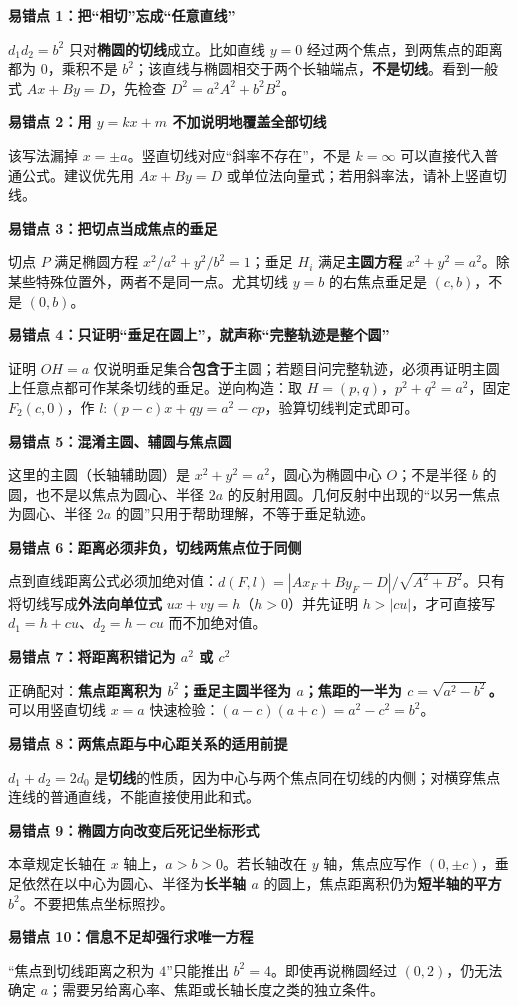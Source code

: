 \begin{trapbox}
\textbf{易错点 1：把“相切”忘成“任意直线”}\par
$d_1d_2=b^2$ 只对\textbf{椭圆的切线}成立。比如直线 $y=0$ 经过两个焦点，到两焦点的距离都为 $0$，乘积不是 $b^2$；该直线与椭圆相交于两个长轴端点，\textbf{不是切线}。看到一般式 $Ax+By=D$，先检查 $D^2=a^2A^2+b^2B^2$。

\medskip
\textbf{易错点 2：用 $y=kx+m$ 不加说明地覆盖全部切线}\par
该写法漏掉 $x=\pm a$。竖直切线对应“斜率不存在”，不是 $k=\infty$ 可以直接代入普通公式。建议优先用 $Ax+By=D$ 或单位法向量式；若用斜率法，请补上竖直切线。

\medskip
\textbf{易错点 3：把切点当成焦点的垂足}\par
切点 $P$ 满足椭圆方程 $x^2/a^2+y^2/b^2=1$；垂足 $H_i$ 满足\textbf{主圆方程} $x^2+y^2=a^2$。除某些特殊位置外，两者不是同一点。尤其切线 $y=b$ 的右焦点垂足是 $(c,b)$，不是 $(0,b)$。

\medskip
\textbf{易错点 4：只证明“垂足在圆上”，就声称“完整轨迹是整个圆”}\par
证明 $OH=a$ 仅说明垂足集合\textbf{包含于}主圆；若题目问完整轨迹，必须再证明主圆上任意点都可作某条切线的垂足。逆向构造：取 $H=(p,q)$，$p^2+q^2=a^2$，固定 $F_2(c,0)$，作 $l:(p-c)x+qy=a^2-cp$，验算切线判定式即可。

\medskip
\textbf{易错点 5：混淆主圆、辅圆与焦点圆}\par
这里的主圆（长轴辅助圆）是 $x^2+y^2=a^2$，圆心为椭圆中心 $O$；不是半径 $b$ 的圆，也不是以焦点为圆心、半径 $2a$ 的反射用圆。几何反射中出现的“以另一焦点为圆心、半径 $2a$ 的圆”只用于帮助理解，不等于垂足轨迹。

\medskip
\textbf{易错点 6：距离必须非负，切线两焦点位于同侧}\par
点到直线距离公式必须加绝对值：$d(F,l)=|Ax_F+By_F-D|/\sqrt{A^2+B^2}$。只有将切线写成\textbf{外法向单位式} $ux+vy=h$（$h>0$）并先证明 $h>|cu|$，才可直接写 $d_1=h+cu$、$d_2=h-cu$ 而不加绝对值。

\medskip
\textbf{易错点 7：将距离积错记为 $a^2$ 或 $c^2$}\par
正确配对：\textbf{焦点距离积为 $b^2$；垂足主圆半径为 $a$；焦距的一半为 $c=\sqrt{a^2-b^2}$。} 可以用竖直切线 $x=a$ 快速检验：$(a-c)(a+c)=a^2-c^2=b^2$。

\medskip
\textbf{易错点 8：两焦点距与中心距关系的适用前提}\par
$d_1+d_2=2d_0$ 是\textbf{切线}的性质，因为中心与两个焦点同在切线的内侧；对横穿焦点连线的普通直线，不能直接使用此和式。

\medskip
\textbf{易错点 9：椭圆方向改变后死记坐标形式}\par
本章规定长轴在 $x$ 轴上，$a>b>0$。若长轴改在 $y$ 轴，焦点应写作 $(0,\pm c)$，垂足依然在以中心为圆心、半径为\textbf{长半轴 $a$} 的圆上，焦点距离积仍为\textbf{短半轴的平方 $b^2$}。不要把焦点坐标照抄。

\medskip
\textbf{易错点 10：信息不足却强行求唯一方程}\par
“焦点到切线距离之积为 $4$”只能推出 $b^2=4$。即使再说椭圆经过 $(0,2)$，仍无法确定 $a$；需要另给离心率、焦距或长轴长度之类的独立条件。
\end{trapbox}
